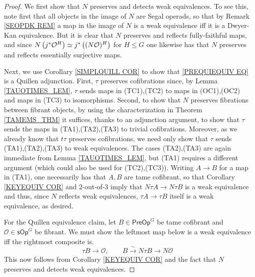 \documentclass[a4paper,10pt
,draft
]{article}%
\numberwithin{equation}{section}
\numberwithin{figure}{section}
\theoremstyle{definition} %
\renewcommand{\O}{\ensuremath{\mathcal O}}
\newcommand{\1}{\ensuremath{\mathbbm 1}}%
\begin{document}
\begin{proof}
	We first show that $N$ preserves and detects weak equivalences.
	To see this, note first that all objects in the image of $N$ are Segal operads, so that by Remark \ref{SEOPDK REM} a map in the image of $N$ is a weak equivalence iff it is a Dwyer-Kan equivalence.
	But it is clear that $N$ preserves and reflects fully-faithful maps,
	and since
	$N \left(j^{\**} \O^H \right)
	\simeq
	j^{\**} \left( (N \O)^H \right)$
	for $H\leq G$
	one likewise has that 
	$N$ preserves and reflects essentially surjective maps.
	
	Next, we use Corollary \ref{SIMPLQUILL COR}
	to show that \eqref{PREQUIEQUIV EQ}
	is a Quillen adjunction.
	First,
	$\tau$ preserves cofibrations since,
	by Lemma \ref{TAUOTIMES_LEM},
	$\tau$ sends maps in (TC1),(TC2) to maps in (OC1),(OC2)
	and maps in (TC3) to isomorphisms.
	Second, to show that $N$ preserves fibrations between fibrant objects,
	by using the characterization in Theorem \ref{TAMEMS_THM}
	it suffices, thanks to an adjunction argument,
	to show that $\tau$
	sends the maps in (TA1),(TA2),(TA3)
	to trivial cofibrations. 
	Moreover, as we already know that $t\tau$ preserves cofibrations, we need only show 	that $\tau$
	sends (TA1),(TA2),(TA3)
	to weak equivalences.
	The cases (TA2),(TA3) are again immediate 
	from Lemma \ref{TAUOTIMES_LEM},
	but (TA1) requires a different argument
	(which could also be used for (TC2),(TC3)).
	Writing $A \to B$ for a map in (TA1), one necessarily has that $A,B$ are tame cofibrant, so that
	Corollary \ref{KEYEQUIV COR}
	and $2$-out-of-$3$ imply that 
	$N \tau A \to N \tau B$ is a weak equivalence
	and thus, since $N$ reflects weak equivalences,
	$\tau A \to \tau B$ itself is a weak equivalence,
	as desired.
	
	For the Quillen equivalence claim, 
	let $B \in \mathsf{PreOp}^G$ be tame cofibrant and
	$\mathcal{O} \in \mathsf{sOp}^G$ be fibrant.
	We must show the leftmost map below is a weak equivalence iff 
	the rightmost composite is.
	\[
	\tau B \to \mathcal{O},
	\qquad
	B \xrightarrow{\sim} N \tau B \to N \mathcal{O}
	\]
	This now follows from Corollary \ref{KEYEQUIV COR}
	and the fact that $N$ preserves and detects weak equivalences.
\end{proof}
\end{document}

